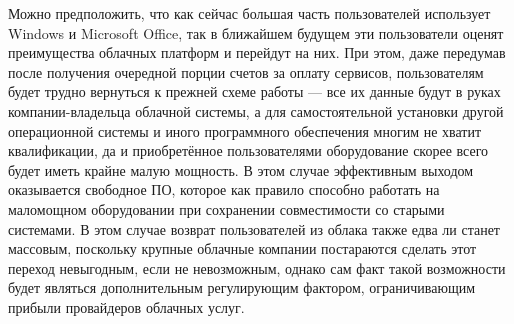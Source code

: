 \documentclass[a5paper,10pt]{article}
\begin{document}
Можно предположить, что как сейчас большая часть пользователей использует Windows и Microsoft Office, так в ближайшем будущем эти пользователи оценят преимущества облачных платформ и перейдут на них. При этом, даже передумав после получения очередной порции счетов за оплату сервисов, пользователям будет трудно вернуться к прежней схеме работы --- все их данные будут в руках компании-владельца облачной системы, а для самостоятельной установки другой операционной системы и иного программного обеспечения многим не хватит квалификации, да и приобретённое пользователями оборудование скорее всего будет иметь крайне малую мощность. В этом случае эффективным выходом оказывается  свободное ПО, которое как правило способно работать на маломощном оборудовании при сохранении совместимости со старыми системами. В этом случае возврат пользователей из облака также едва ли станет массовым, поскольку крупные облачные компании постараются сделать этот переход невыгодным, если не невозможным, однако сам факт такой возможности будет являться дополнительным регулирующим фактором, ограничивающим прибыли провайдеров облачных услуг.
\end{document}

